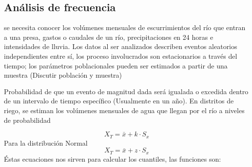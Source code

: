 \subsection{Análisis de frecuencia}
se necesita conocer los volúmenes mensuales de escurrimientos del río que entran a una presa, gastos o caudales de un río, precipitaciones en 24 horas e intensidades de lluvia. Los datos al ser analizados describen eventos aleatorios independientes entre sí, los proceso involucrados son estacionarios a través del tiempo; los parámetros poblacionales pueden ser estimados a partir de una muestra (Discutir población y muestra)
\begin{definition}
    Probabilidad de que un evento de magnitud dada será igualada o excedida dentro de un intervalo de tiempo específico (Usualmente en un año). En distritos de riego, se estiman los volúmenes mensuales de agua que llegan por el río a niveles de probabilidad
\end{definition}
\begin{equation}
    X_T =\bar{x} + k\cdot S_x
\end{equation}
Para la distribución Normal
\begin{equation}
    X_T =\bar{x} + z\cdot S_x
\end{equation}
Éstas ecuaciones nos sirven para calcular los cuantiles, las funciones son:
